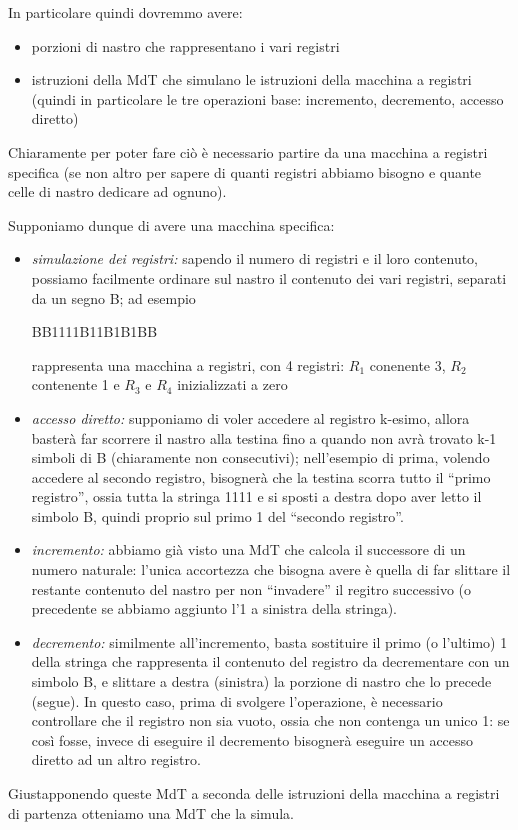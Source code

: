 In particolare quindi dovremmo avere:
\begin{itemize}
\item porzioni di nastro che rappresentano i vari registri
\item istruzioni della MdT che simulano le istruzioni della macchina a registri (quindi in particolare le tre operazioni base: incremento, decremento, accesso diretto)
\end{itemize}
 
Chiaramente per poter fare ci\`o \`e necessario partire da una macchina a registri specifica (se non altro per sapere di quanti registri abbiamo bisogno e quante celle di nastro dedicare ad ognuno).

Supponiamo dunque di avere una macchina specifica:
\begin{itemize}
\item \emph{simulazione dei registri:} sapendo il numero di registri e il loro contenuto, possiamo facilmente ordinare sul nastro il contenuto dei vari registri, separati da un segno B; ad esempio
\begin{center}
BB1111B11B1B1BB
\end{center}
rappresenta una macchina a registri, con 4 registri: $R_1$ conenente 3, $R_2$ contenente 1 e $R_3$ e $R_4$ inizializzati a zero
\item \emph{accesso diretto:} supponiamo di voler accedere al registro k-esimo, allora baster\`a far scorrere il nastro alla testina fino a quando non avr\`a trovato k-1 simboli di B (chiaramente non consecutivi); nell'esempio di prima, volendo accedere al secondo registro, bisogner\`a che la testina scorra tutto il ``primo registro'', ossia tutta la stringa 1111 e si sposti a destra dopo aver letto il simbolo B, quindi proprio sul primo 1 del ``secondo registro''.
\item \emph{incremento:} abbiamo gi\`a visto una MdT che calcola il successore di un numero naturale: l'unica accortezza che bisogna avere \`e quella di far slittare il restante contenuto del nastro per non ``invadere'' il regitro successivo (o precedente se abbiamo aggiunto l'1 a sinistra della stringa).
\item \emph{decremento:} similmente all'incremento, basta sostituire il primo (o l'ultimo) 1 della stringa che rappresenta il contenuto del registro da decrementare con un simbolo B, e slittare a destra (sinistra) la porzione di nastro che lo precede (segue). In questo caso, prima di svolgere l'operazione, \`e necessario controllare che il registro non sia vuoto, ossia che non contenga un unico 1: se cos\`i fosse, invece di eseguire il decremento bisogner\`a eseguire un accesso diretto ad un altro registro.

 
\end{itemize}

Giustapponendo queste MdT a seconda delle istruzioni della macchina a registri di partenza otteniamo una MdT che la simula.
